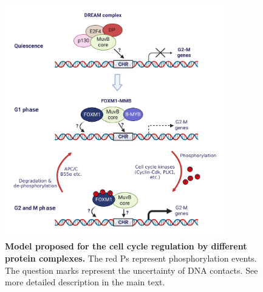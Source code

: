 \begin{figure}[!h]
    \centering
    \includegraphics[width=0.85\textwidth]{chapter3/figures_foxm1/fig38.pdf}
    \caption[Model proposed for the cell cycle regulation by different protein complexes]{\textbf{Model proposed for the cell cycle regulation by different protein complexes.} The red Ps represent phosphorylation events. The question marks represent the uncertainty of DNA contacts. See more detailed description in the main text.}
    \label{fig:fig38}
\end{figure}

